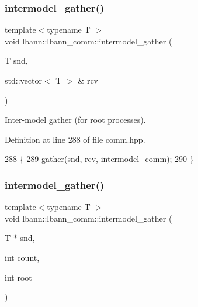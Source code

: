\subsubsection{\texorpdfstring{intermodel\+\_\+gather()}{intermodel\_gather()}\hspace{0.1cm}{\footnotesize\ttfamily [2/4]}}
{\footnotesize\ttfamily template$<$typename T $>$ \\
void lbann\+::lbann\+\_\+comm\+::intermodel\+\_\+gather (\begin{DoxyParamCaption}\item[{T}]{snd,  }\item[{std\+::vector$<$ T $>$ \&}]{rcv }\end{DoxyParamCaption})\hspace{0.3cm}{\ttfamily [inline]}}

Inter-\/model gather (for root processes). 

Definition at line 288 of file comm.\+hpp.


\begin{DoxyCode}
288                                                    \{
289     \hyperlink{classlbann_1_1lbann__comm_aa784298e6ed0f9f01a20b179d5110df9}{gather}(snd, rcv, \hyperlink{classlbann_1_1lbann__comm_a2c51c5d8faf4f0ab4f43b892c55e597b}{intermodel\_comm});
290   \}
\end{DoxyCode}
\mbox{\label{classlbann_1_1lbann__comm_a3fe4457945fb78769a69ac7f86e4bc11}} 
\subsubsection{\texorpdfstring{intermodel\+\_\+gather()}{intermodel\_gather()}\hspace{0.1cm}{\footnotesize\ttfamily [3/4]}}
{\footnotesize\ttfamily template$<$typename T $>$ \\
void lbann\+::lbann\+\_\+comm\+::intermodel\+\_\+gather (\begin{DoxyParamCaption}\item[{T $\ast$}]{snd,  }\item[{int}]{count,  }\item[{int}]{root }\end{DoxyParamCaption})\hspace{0.3cm}{\ttfamily [inline]}}

